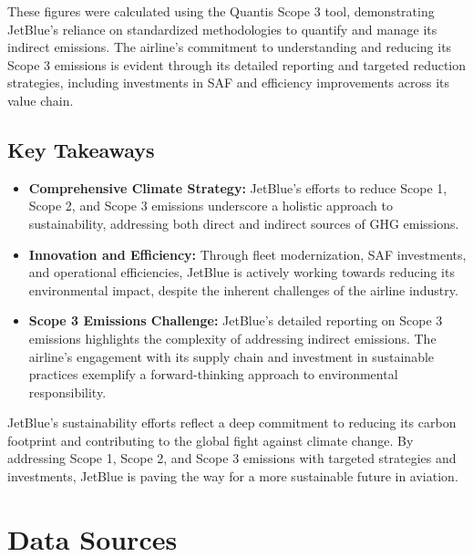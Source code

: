 \noindent These figures were calculated using the Quantis Scope 3 tool, demonstrating JetBlue's reliance on standardized methodologies to quantify and manage its indirect emissions. The airline's commitment to understanding and reducing its Scope 3 emissions is evident through its detailed reporting and targeted reduction strategies, including investments in SAF and efficiency improvements across its value chain.

\subsection*{Key Takeaways}
\begin{itemize}
    \item \textbf{Comprehensive Climate Strategy:} JetBlue's efforts to reduce Scope 1, Scope 2, and Scope 3 emissions underscore a holistic approach to sustainability, addressing both direct and indirect sources of GHG emissions.
    \item \textbf{Innovation and Efficiency:} Through fleet modernization, SAF investments, and operational efficiencies, JetBlue is actively working towards reducing its environmental impact, despite the inherent challenges of the airline industry.
    \item \textbf{Scope 3 Emissions Challenge:} JetBlue's detailed reporting on Scope 3 emissions highlights the complexity of addressing indirect emissions. The airline's engagement with its supply chain and investment in sustainable practices exemplify a forward-thinking approach to environmental responsibility.
\end{itemize}

\noindent JetBlue's sustainability efforts reflect a deep commitment to reducing its carbon footprint and contributing to the global fight against climate change. By addressing Scope 1, Scope 2, and Scope 3 emissions with targeted strategies and investments, JetBlue is paving the way for a more sustainable future in aviation.


\newpage
\section{Data Sources}

